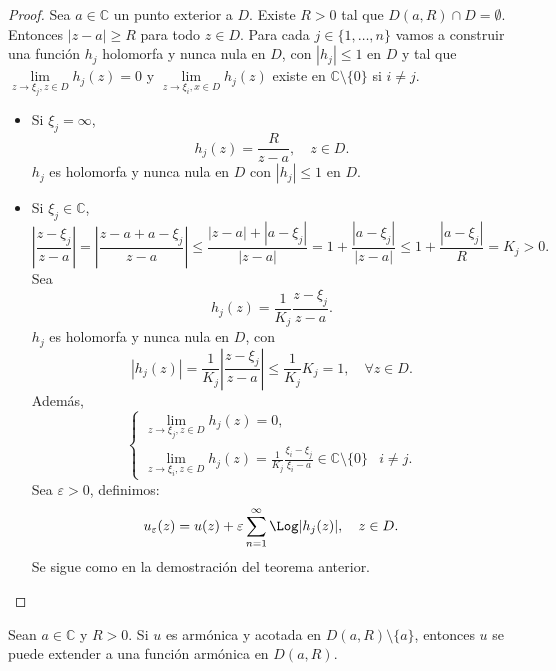 \begin{proof}
    Sea $a \in \mathbb{C}$ un punto exterior a $D$.
    Existe $R > 0$ tal que $D(a, R) \cap D = \emptyset$.
    Entonces $|z-a| \geq R$ para todo $z \in D$.
    Para cada $j \in \{1, \dots, n\}$ vamos a construir una función $h_j$ holomorfa y nunca nula en $D$, con $|h_j| \leq 1$ en $D$ y tal que $\lim\limits_{z \to \xi_j, z \in D} h_j(z) = 0$ y $\lim\limits_{z \to \xi_i, x \in D} h_j(z)$ existe en $\mathbb{C} \setminus \{0\}$ si $i \neq j$.
    \begin{itemize}
        \item Si $\xi_j = \infty$,
              $$h_j(z) = \frac{R}{z-a}, \quad z \in D.$$
              $h_j$ es holomorfa y nunca nula en $D$ con $|h_j| \leq 1$ en $D$.

        \item Si $\xi_j \in \mathbb{C}$,
              $$\left|\frac{z-\xi_j}{z-a}\right| = \left|\frac{z-a+a-\xi_j}{z-a}\right| \leq \frac{|z-a|+|a-\xi_j|}{|z-a|} = 1 + \frac{|a-\xi_j|}{|z-a|} \leq 1 + \frac{|a-\xi_j|}{R} = K_j > 0.$$
              Sea
              $$h_j(z) = \frac{1}{K_j}\frac{z-\xi_j}{z-a}.$$
              $h_j$ es holomorfa y nunca nula en $D$, con
              $$|h_j(z)| = \frac{1}{K_j}\left|\frac{z-\xi_j}{z-a}\right| \leq \frac{1}{K_j}K_j = 1, \quad \forall z \in D.$$
              Además,
              $$\begin{cases}
                      \lim_{z \to \xi_j, z \in D} h_j(z) = 0,                                                                                  \\
                      \lim_{z \to \xi_i, z \in D} h_j(z) = \frac{1}{K_j}\frac{\xi_i-\xi_j}{\xi_i-a} \in \mathbb{C} \setminus \{0\} & i \neq j.
                  \end{cases}$$
              Sea $\varepsilon > 0$, definimos:
              $$u_\varepsilon(z) = u(z) + \varepsilon \sum_{n=1}^\infty \Log|h_j(z)|, \quad z \in D.$$
              Se sigue como en la demostración del teorema anterior.
    \end{itemize}
\end{proof}

\begin{theorem}
    Sean $a \in \mathbb{C}$ y $R > 0$.
    Si $u$ es armónica y acotada en $D(a, R) \setminus \{a\}$, entonces $u$ se puede extender a una función armónica en $D(a, R)$.
\end{theorem}

